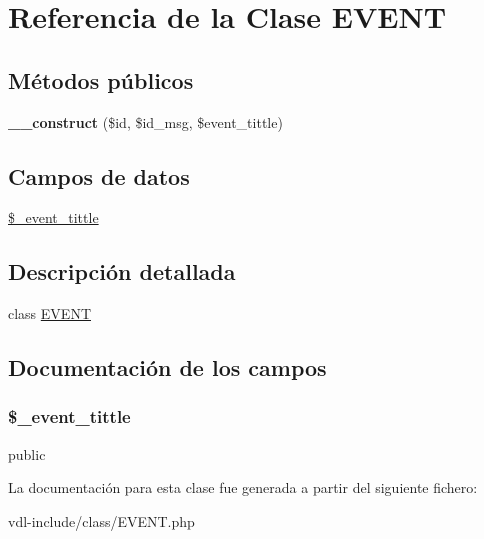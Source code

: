 \hypertarget{class_e_v_e_n_t}{\section{Referencia de la Clase E\-V\-E\-N\-T}
\label{class_e_v_e_n_t}
}
\subsection*{Métodos públicos}
\begin{DoxyCompactItemize}
\item 
\hypertarget{class_e_v_e_n_t_aa65c2b4b469031c814ac5c43f400dba9}{{\bfseries \-\_\-\-\_\-construct} (\$id, \$id\-\_\-msg, \$event\-\_\-tittle)}\label{class_e_v_e_n_t_aa65c2b4b469031c814ac5c43f400dba9}

\end{DoxyCompactItemize}
\subsection*{Campos de datos}
\begin{DoxyCompactItemize}
\item 
\hyperlink{class_e_v_e_n_t_a2a136ab40c3109fff873d8e2d1e2d481}{\$\-\_\-event\-\_\-tittle}
\end{DoxyCompactItemize}


\subsection{Descripción detallada}
class \hyperlink{class_e_v_e_n_t}{E\-V\-E\-N\-T} 

\subsection{Documentación de los campos}
\hypertarget{class_e_v_e_n_t_a2a136ab40c3109fff873d8e2d1e2d481}{
\subsubsection[{\$\-\_\-event\-\_\-tittle}]{\setlength{\rightskip}{0pt plus 5cm}\$\-\_\-event\-\_\-tittle}}\label{class_e_v_e_n_t_a2a136ab40c3109fff873d8e2d1e2d481}
public 

La documentación para esta clase fue generada a partir del siguiente fichero\-:\begin{DoxyCompactItemize}
\item 
vdl-\/include/class/E\-V\-E\-N\-T.\-php\end{DoxyCompactItemize}
